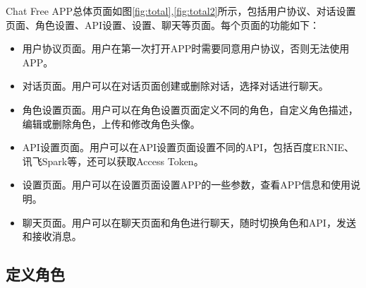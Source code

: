 \documentclass{article}
\begin{document}
Chat Free APP总体页面如图\ref{fig:total},\ref{fig:total2}所示，包括用户协议、对话设置页面、角色设置、API设置、设置、聊天等页面。每个页面的功能如下：

\begin{itemize}
    \item 用户协议页面。用户在第一次打开APP时需要同意用户协议，否则无法使用APP。
    \item 对话页面。用户可以在对话页面创建或删除对话，选择对话进行聊天。
    \item 角色设置页面。用户可以在角色设置页面定义不同的角色，自定义角色描述，编辑或删除角色，上传和修改角色头像。
    \item API设置页面。用户可以在API设置页面设置不同的API，包括百度ERNIE、讯飞Spark等，还可以获取Access Token。
    \item 设置页面。用户可以在设置页面设置APP的一些参数，查看APP信息和使用说明。
    \item 聊天页面。用户可以在聊天页面和角色进行聊天，随时切换角色和API，发送和接收消息。
\end{itemize}

\newpage
\subsection{定义角色}
\end{document}

